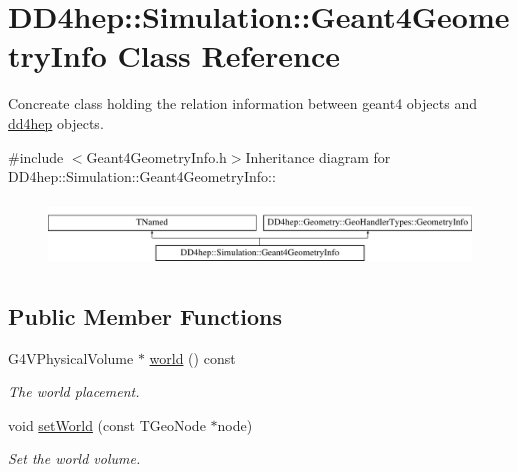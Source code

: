 \hypertarget{class_d_d4hep_1_1_simulation_1_1_geant4_geometry_info}{
\section{DD4hep::Simulation::Geant4GeometryInfo Class Reference}
\label{class_d_d4hep_1_1_simulation_1_1_geant4_geometry_info}
}


Concreate class holding the relation information between geant4 objects and \hyperlink{namespacedd4hep}{dd4hep} objects.  


{\ttfamily \#include $<$Geant4GeometryInfo.h$>$}Inheritance diagram for DD4hep::Simulation::Geant4GeometryInfo::\begin{figure}[H]
\begin{center}
\leavevmode
\includegraphics[height=1.77778cm]{class_d_d4hep_1_1_simulation_1_1_geant4_geometry_info}
\end{center}
\end{figure}
\subsection*{Public Member Functions}
\begin{DoxyCompactItemize}
\item 
G4VPhysicalVolume $\ast$ \hyperlink{class_d_d4hep_1_1_simulation_1_1_geant4_geometry_info_ae30a4105631ddcfa4221f208b31b3580}{world} () const 
\begin{DoxyCompactList}\small\item\em The world placement. \item\end{DoxyCompactList}\item 
void \hyperlink{class_d_d4hep_1_1_simulation_1_1_geant4_geometry_info_a9ccd539edd7ae098b69bcb3b035b8daf}{setWorld} (const TGeoNode $\ast$node)
\begin{DoxyCompactList}\small\item\em Set the world volume. \item\end{DoxyCompactList}\end{DoxyCompactItemize}
